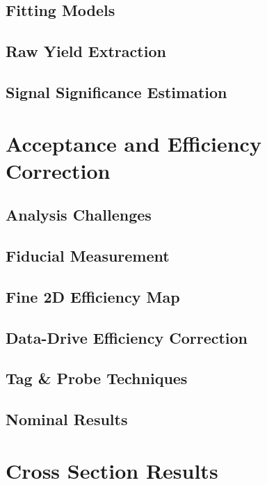 \subsection{Fitting Models}

\subsection{Raw Yield Extraction}

\subsection{Signal Significance Estimation}

\section{Acceptance and Efficiency Correction} 

\subsection{Analysis Challenges}

\subsection{Fiducial Measurement}

\subsection{Fine 2D Efficiency Map}

\subsection{Data-Drive Efficiency Correction}

\subsection{Tag \& Probe Techniques}

\subsection{Nominal Results}

\section{Cross Section Results} 

